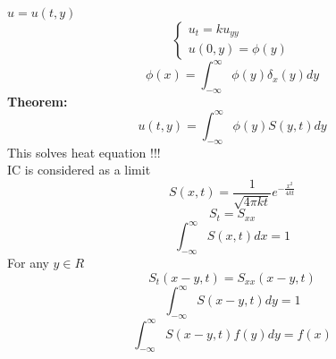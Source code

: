 \documentclass{article}
\begin{document}
$u = u(t,y)$\\
$$\begin{cases}
    u_t = k u_{yy}\\
    u(0,y) = \phi(y)
\end{cases}
$$
$$ \phi(x) = \int_{-\infty}^{\infty} \phi(y) \delta_x(y) dy$$
\textbf{Theorem:} \\
$$u(t,y) = \int_{-\infty}^{\infty} \phi(y) S(y,t) dy$$
This solves heat equation !!!\\
IC is considered as a limit \\

$$S(x,t) = \frac{1}{\sqrt{4\pi kt}} e^{-\frac{x^2}{4kt}}$$
$$S_t = S_{xx}$$
$$\int_{-\infty}^{\infty} S(x,t) dx = 1$$
For any $y \in R$ \\
$$ S_t(x-y,t) = S_{xx}(x-y,t)$$
$$ \int_{-\infty}^{\infty} S(x-y,t) dy = 1$$
$$ \int_{-\infty}^{\infty} S(x-y,t) f(y) dy = f(x)$$
\end{document}
